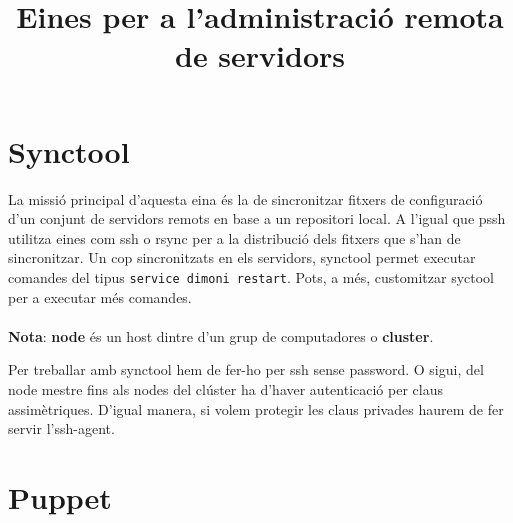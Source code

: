 \documentclass[a4paper]{article}
\begin{document}
\title{Eines per a l'administració remota de servidors}
\maketitle

\begin{comment}
oddsidemargin \the\oddsidemargin \newline
textwidth \the\textwidth \newline
marginparsep \the\marginparsep \newline
marginparwidth \the\marginparwidth \newline
hoffset \the\hoffset \newline
paperwidth \the\paperwidth 
\end{comment}

\section{Synctool}
La missió principal d'aquesta eina \'es la de sincronitzar fitxers de configuració d'un conjunt de servidors remots en base a un repositori local.
A l'igual que pssh utilitza eines com ssh o rsync per a la distribució dels fitxers que s'han de sincronitzar. Un cop sincronitzats en els servidors, synctool permet executar comandes del tipus \verb+service dimoni restart+. Pots, a m\'es, customitzar syctool per a executar m\'es comandes.\\
\\
\textbf{Nota}: \textbf{node} \'es un host dintre d'un grup de computadores o \textbf{cluster}.

Per treballar amb synctool hem de fer-ho per ssh sense password. O sigui, del node mestre fins als nodes del clúster ha d'haver autenticació per claus assimètriques. D'igual manera, si volem protegir les claus privades haurem de fer servir l'ssh-agent.


\section{Puppet}

\end{document}
